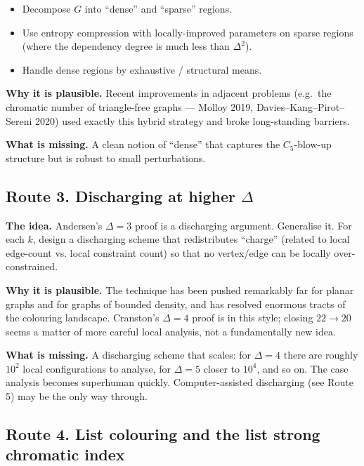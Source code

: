 \documentclass[11pt]{article}
\begin{document}
\begin{itemize}[leftmargin=*, itemsep=2pt]
  \item Decompose $G$ into ``dense'' and ``sparse'' regions.
  \item Use entropy compression with locally-improved parameters on
        sparse regions (where the dependency degree is much less
        than $\Delta^2$).
  \item Handle dense regions by exhaustive / structural means.
\end{itemize}

\textbf{Why it is plausible.} Recent improvements in adjacent
problems (e.g.\ the chromatic number of triangle-free graphs ---
Molloy 2019, Davies--Kang--Pirot--Sereni 2020) used exactly this
hybrid strategy and broke long-standing barriers.

\textbf{What is missing.} A clean notion of ``dense'' that captures
the $C_5$-blow-up structure but is robust to small perturbations.

\subsection*{Route 3. Discharging at higher $\Delta$}

\textbf{The idea.} Andersen's $\Delta = 3$ proof is a discharging
argument. Generalise it. For each $k$, design a discharging scheme
that redistributes ``charge'' (related to local edge-count vs.
local constraint count) so that no vertex/edge can be locally
over-constrained.

\textbf{Why it is plausible.} The technique has been pushed
remarkably far for planar graphs and for graphs of bounded density,
and has resolved enormous tracts of the colouring landscape.
Cranston's $\Delta = 4$ proof is in this style; closing $22 \to 20$
seems a matter of more careful local analysis, not a fundamentally
new idea.

\textbf{What is missing.} A discharging scheme that scales: for
$\Delta = 4$ there are roughly $10^2$ local configurations to
analyse, for $\Delta = 5$ closer to $10^4$, and so on. The case
analysis becomes superhuman quickly. Computer-assisted discharging
(see Route 5) may be the only way through.

\subsection*{Route 4. List colouring and the list strong chromatic index}
\end{document}
